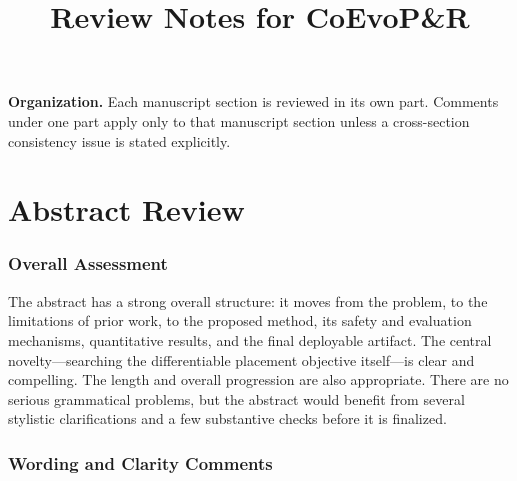\documentclass[11pt]{article}
\title{Review Notes for CoEvoP\&R}
\author{}
\date{}
\begin{document}
\maketitle

\noindent\textbf{Organization.} Each manuscript section is reviewed in its own
part. Comments under one part apply only to that manuscript section unless a
cross-section consistency issue is stated explicitly.

\tableofcontents
\clearpage

\part{Abstract Review}

\section{Overall Assessment}

The abstract has a strong overall structure: it moves from the problem, to the
limitations of prior work, to the proposed method, its safety and evaluation
mechanisms, quantitative results, and the final deployable artifact. The
central novelty---searching the differentiable placement objective itself---is
clear and compelling. The length and overall progression are also appropriate.
There are no serious grammatical problems, but the abstract would benefit from
several stylistic clarifications and a few substantive checks before it is
finalized.

\section{Wording and Clarity Comments}
\end{document}
